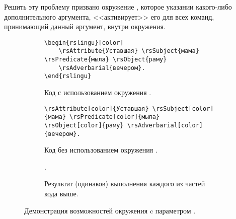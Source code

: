 Решить эту проблему призвано окружение , которое указании какого-либо дополнительного аргумента, <<активирует>> его для всех команд, принимающий данный аргумент, внутри окружения.
\begin{figure}[htp!]
    \centering
    \begin{subfigure}{\textwidth}
        \begin{verbatim}
\begin{rslingu}[color]
    \rsAttribute{Уставшая} \rsSubject{мама} \rsPredicate{мыла} \rsObject{раму}
    \rsAdverbarial{вечером}.
\end{rslingu}
        \end{verbatim}
    \caption{Код с использованием окружения .}
    \end{subfigure}\vspace*{.75cm}
    \begin{subfigure}{\textwidth}
        \begin{verbatim}
\rsAttribute[color]{Уставшая} \rsSubject[color]{мама} \rsPredicate[color]{мыла}
\rsObject[color]{раму} \rsAdverbarial[color]{вечером}.
        \end{verbatim}
    \caption{Код без использованием окружения .}
    \end{subfigure}\vspace*{.75cm}
    \begin{subfigure}{.9\textwidth}
        \centering
        \begin{rslingu}[color]
                .
        \end{rslingu}
    \caption{Результат (одинаков) выполнения каждого из частей кода выше.}
    \end{subfigure}
    \caption{Демонстрация возможностей окружения  c параметром .}
\end{figure}




